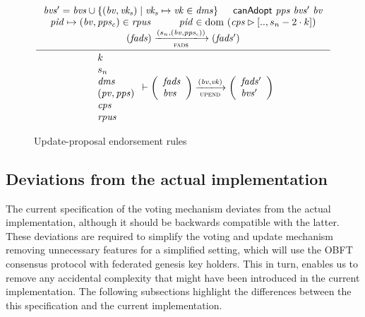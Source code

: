 \begin{figure}[htb]
  \nextdef
  \begin{equation}
    \label{eq:rule:up-canadopt}
    \inference
    {
      \var{bvs'} = \var{bvs} \cup
      \{ (\var{bv}, \var{vk_s}) \mid \var{vk_s} \mapsto \var{vk} \in \var{dms} \}
      & \fun{canAdopt}~\var{pps}~\var{bvs'}~\var{bv} \\
      \var{pid} \mapsto (\var{bv}, \var{pps_c}) \in \var{rpus}
      & \var{pid} \in \dom~(\var{cps} \restrictrange [.., s_n - 2 \cdot k])\\
      (\var{fads}) \trans{fads}{(s_n, (\var{bv}, \var{pps_c}))} (\var{fads'})
    }
    {
      {
        \begin{array}{l}
          k\\
          s_n\\
          \var{dms}\\
          (\var{pv}, \var{pps})\\
          \var{cps}\\
          \var{rpus}
        \end{array}
      }
      \vdash
      {
        \left(
          \begin{array}{l}
            \var{fads}\\
            \var{bvs}
          \end{array}
        \right)
      }
      \trans{upend}{(\var{bv}, \var{vk})}
      {
        \left(
          \begin{array}{l}
            \var{fads'}\\
            \var{bvs'}
          \end{array}
        \right)
      }
    }
  \end{equation}
  \caption{Update-proposal endorsement rules}
  \label{fig:rules:up-end}
\end{figure}

\clearpage

\subsection{Deviations from the actual implementation}
\label{sec:deviation-actual-impl}

The current specification of the voting mechanism deviates from the actual
implementation, although it should be backwards compatible with the latter.
These deviations are required to simplify the voting and update mechanism
removing unnecessary features for a simplified setting, which will use the OBFT
consensus protocol with federated genesis key holders. This in turn, enables us
to remove any accidental complexity that might have been introduced in the
current implementation. The following subsections highlight the differences
between the this specification and the current implementation.

